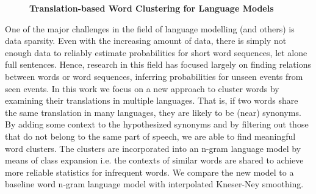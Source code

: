 \documentclass[10pt, a4paper, twopage, headinclude, footinclude, BCOR5mm]{scrartcl}
\begin{document}
\newpage

\begin{figure}[t!]
\centering
\large\textbf{Translation-based Word Clustering for Language Models}
\vspace*{0.5cm}
\end{figure}


        \begin{table}[t!]
    \end{table}
        \begin{table}[t!]
    \end{table}

\noindent
One of the major challenges in the field of language modelling (and others) is data sparsity. Even with the increasing amount of data, there is simply not enough data to reliably estimate probabilities for short word sequences, let alone full sentences. Hence, research in this field has focused largely on finding relations between words or word sequences, inferring probabilities for unseen events from seen events. In this work we focus on a new approach to cluster words by examining their translations in multiple languages. That is, if two words share the same translation in many languages, they are likely to be (near) synonyms.  By adding some context to the hypothesized synonyms and by filtering out those that do not belong to the same part of speech, we are able to find meaningful word clusters. The clusters are incorporated into an n-gram language model by means of class expansion i.e. the contexts of similar words are shared to achieve more reliable statistics for infrequent words. We compare the new model to a baseline word n-gram language model with interpolated Kneser-Ney smoothing.
\end{document}
